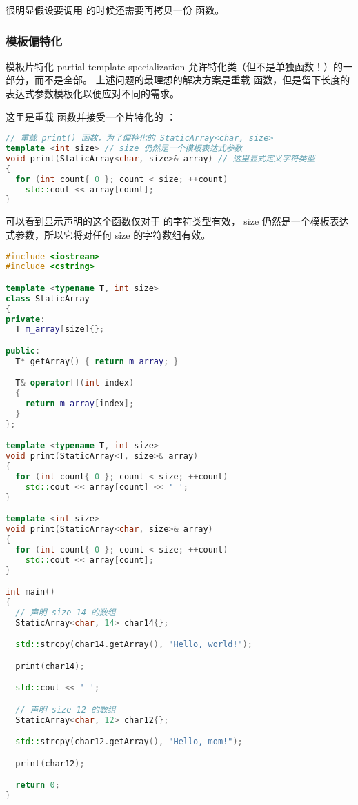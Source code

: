 \documentclass[../../LearnCpp.tex]{subfiles}
\begin{document}
很明显假设要调用  的时候还需要再拷贝一份  函数。

\subsubsection*{模板偏特化}

模板片特化 partial template specialization 允许特化类（但不是单独函数！）的一部分，而不是全部。
上述问题的最理想的解决方案是重载  函数，但是留下长度的表达式参数模板化以便应对不同的需求。

这里是重载  函数并接受一个片特化的 ：

\begin{lstlisting}[language=C++]
// 重载 print() 函数，为了偏特化的 StaticArray<char, size>
template <int size> // size 仍然是一个模板表达式参数
void print(StaticArray<char, size>& array) // 这里显式定义字符类型
{
  for (int count{ 0 }; count < size; ++count)
    std::cout << array[count];
}
\end{lstlisting}

可以看到显示声明的这个函数仅对于  的字符类型有效，
size 仍然是一个模板表达式参数，所以它将对任何 size 的字符数组有效。

\begin{lstlisting}[language=C++]
#include <iostream>
#include <cstring>

template <typename T, int size>
class StaticArray
{
private:
  T m_array[size]{};

public:
  T* getArray() { return m_array; }

  T& operator[](int index)
  {
    return m_array[index];
  }
};

template <typename T, int size>
void print(StaticArray<T, size>& array)
{
  for (int count{ 0 }; count < size; ++count)
    std::cout << array[count] << ' ';
}

template <int size>
void print(StaticArray<char, size>& array)
{
  for (int count{ 0 }; count < size; ++count)
    std::cout << array[count];
}

int main()
{
  // 声明 size 14 的数组
  StaticArray<char, 14> char14{};

  std::strcpy(char14.getArray(), "Hello, world!");

  print(char14);

  std::cout << ' ';

  // 声明 size 12 的数组
  StaticArray<char, 12> char12{};

  std::strcpy(char12.getArray(), "Hello, mom!");

  print(char12);

  return 0;
}
\end{lstlisting}
\end{document}
